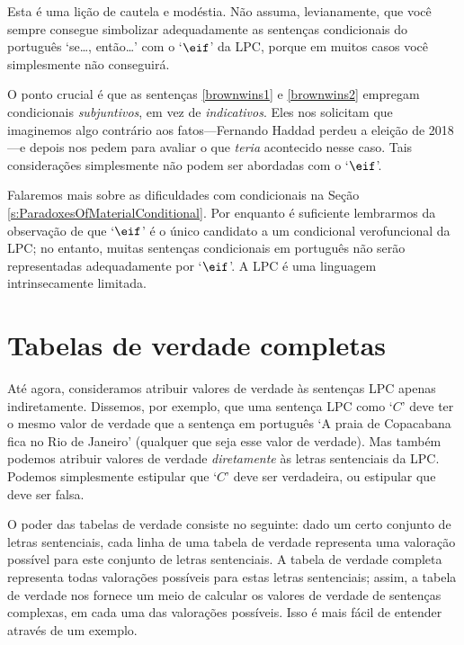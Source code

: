 Esta é uma lição de cautela e modéstia.
Não assuma, levianamente, que você sempre consegue simbolizar adequadamente as sentenças condicionais do português `se\ldots, então\ldots' com o `$\eif$' da LPC, porque em muitos casos você simplesmente não conseguirá.

O ponto crucial é que as sentenças \ref{brownwins1} e \ref{brownwins2} empregam condicionais \emph{subjuntivos}, em vez de \emph{indicativos}.
Eles nos solicitam que imaginemos algo contrário aos fatos---Fernando Haddad perdeu a eleição de 2018---e depois nos pedem para avaliar o que \emph{teria} acontecido nesse caso.
Tais considerações simplesmente não podem ser abordadas com o  `$\eif$'.

Falaremos mais sobre as dificuldades com condicionais na Seção \ref{s:ParadoxesOfMaterialConditional}.
Por enquanto é suficiente lembrarmos da observação de que `$\eif$' é o único candidato a um condicional verofuncional da LPC; no entanto, muitas sentenças condicionais em português não serão representadas adequadamente por `$\eif$'.
A LPC é uma linguagem intrinsecamente limitada.


\chapter{Tabelas de verdade completas}
\label{s:CompleteTruthTables}

Até agora, consideramos atribuir valores de verdade às sentenças LPC apenas indiretamente.
Dissemos, por exemplo, que uma sentença LPC como `$C$' deve ter o mesmo valor de verdade que a sentença em português `A praia de Copacabana fica no Rio de Janeiro' (qualquer que seja esse valor de verdade).
Mas também podemos atribuir valores de verdade \emph{diretamente} às letras sentenciais da LPC.
Podemos simplesmente estipular que `$C$' deve ser verdadeira, ou estipular que deve ser falsa.

O poder das tabelas de verdade consiste no seguinte:
dado um certo conjunto de letras sentenciais, cada linha de uma tabela de verdade representa uma valoração possível para este conjunto de letras sentenciais.
A tabela de verdade completa representa todas valorações possíveis para estas letras sentenciais; assim, a tabela de verdade nos fornece um meio de calcular os valores de verdade de sentenças complexas, em cada uma das valorações possíveis.
Isso é mais fácil de entender através de um exemplo.

